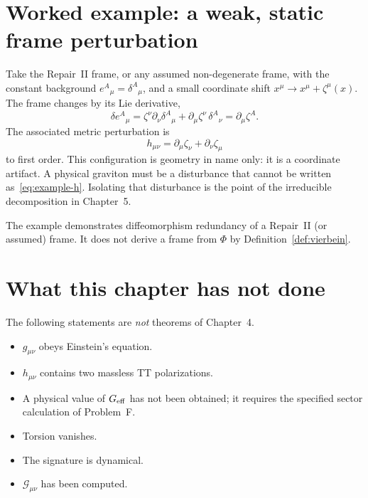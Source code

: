 \section{Worked example: a weak, static frame perturbation}
\label{sec:ch4-example}

Take the Repair~II frame, or any assumed non-degenerate frame, with
the constant background \(e^A{}_\mu=\delta^A{}_\mu\), and a small
coordinate shift \(x^\mu\to x^\mu+\zeta^\mu(x)\). The frame changes by
its Lie derivative,
\begin{equation}
  \label{eq:example-e}
  \delta e^A{}_\mu
  =\zeta^\nu\partial_\nu\delta^A{}_\mu
   +\partial_\mu\zeta^\nu\,\delta^A{}_\nu
  =\partial_\mu\zeta^A .
\end{equation}
The associated metric perturbation is
\begin{equation}
  \label{eq:example-h}
  h_{\mu\nu}
  =\partial_\mu\zeta_\nu+\partial_\nu\zeta_\mu
\end{equation}
to first order. This configuration is geometry in name only: it is a
coordinate artifact. A physical graviton must be a disturbance that
cannot be written as~\eqref{eq:example-h}. Isolating that disturbance
is the point of the irreducible decomposition in Chapter~5.

The example demonstrates diffeomorphism redundancy of a Repair~II
(or assumed) frame. It does not derive a frame from \(\Phi\) by
Definition~\ref{def:vierbein}.

\section{What this chapter has not done}
\label{sec:ch4-not-done}

The following statements are \emph{not} theorems of Chapter~4.

\begin{itemize}
  \item \(g_{\mu\nu}\) obeys Einstein's equation.
  \item \(h_{\mu\nu}\) contains two massless TT polarizations.
  \item A physical value of \(G_{\mathrm{eff}}\) has not been obtained; it
        requires the specified sector calculation of Problem~F.
  \item Torsion vanishes.
  \item The signature is dynamical.
  \item \(\mathcal{G}_{\mu\nu}\) has been computed.
\end{itemize}

